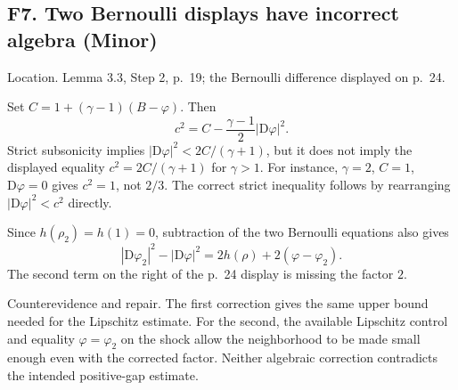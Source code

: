 \documentclass[10pt]{article}
\begin{document}
\subsection*{F7. Two Bernoulli displays have incorrect algebra (Minor)}
Location. Lemma 3.3, Step 2, p. 19; the Bernoulli difference displayed on p. 24.\par
Set \(C=1+(\gamma-1)(B-\varphi)\). Then \[c^2=C-\frac{\gamma-1}{2}|\mathrm D\varphi|^2.\] Strict subsonicity implies \(|\mathrm D\varphi|^2<2C/(\gamma+1)\), but it does not imply the displayed equality \(c^2=2C/(\gamma+1)\) for \(\gamma>1\). For instance, \(\gamma=2\), \(C=1\), \(\mathrm D\varphi=0\) gives \(c^2=1\), not \(2/3\). The correct strict inequality follows by rearranging \(|\mathrm D\varphi|^2<c^2\) directly.\par
Since \(h(\rho_2)=h(1)=0\), subtraction of the two Bernoulli equations also gives \[|\mathrm D\varphi_2|^2-|\mathrm D\varphi|^2
 =2h(\rho)+2(\varphi-\varphi_2).\] The second term on the right of the p. 24 display is missing the factor \(2\).\par
Counterevidence and repair. The first correction gives the same upper bound needed for the Lipschitz estimate. For the second, the available Lipschitz control and equality \(\varphi=\varphi_2\) on the shock allow the neighborhood to be made small enough even with the corrected factor. Neither algebraic correction contradicts the intended positive-gap estimate.\par
\end{document}
